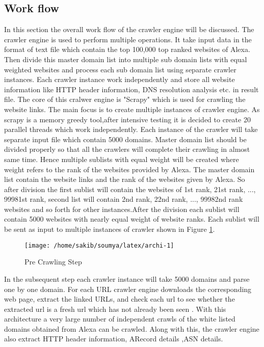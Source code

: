 \subsection{Work flow}
\noindent In this section the overall work flow of the crawler engine will be discussed. The crawler engine is used to perform multiple operations. It take input data in the format of text file which contain the top 100,000 top ranked websites of Alexa. Then divide this master domain list into multiple sub domain lists with equal weighted websites and process each sub domain list using separate crawler instances. Each crawler instance work independently and store all website information like HTTP header information, DNS resolution analysis etc. in result file. The core of this cralwer engine is "Scrapy" which is used for crawling the website links. The main focus is to create multiple instances of crawler engine. As scrapy is a memory greedy tool,after intensive testing it is decided to create 20 parallel threads which work independently. Each instance of the crawler will take separate input file which contain 5000 domains. Master domain list should be divided properly so that all the crawlers will complete their crawling in almost same time. Hence multiple sublists with equal weight will be created where weight refers to the rank of the websites provided by Alexa. The master domain list contain the website links and the rank of the websites given by Alexa. So after division the first sublist will contain the websites of 1st rank, 21st rank, ..., 99981st rank, second list will contain 2nd rank, 22nd rank, ..., 99982nd rank websites and so forth for other instances.After the division each sublist will contain 5000 websites with nearly equal weight of website ranks. Each sublist will be sent as input to multiple instances of crawler shown in Figure \ref{fig:crawl}. \\

\begin{figure}[htb]
  \centering
  \texttt{[image: /home/sakib/soumya/latex/archi-1]}\\
  \caption{Pre Crawling Step}
  \label{fig:crawl}
\end{figure}

\noindent In the subsequent step each crawler instance will take 5000 domains and parse one by one domain. For each URL crawler engine downloads the corresponding web page, extract the linked URLs, and check each url to see whether the extracted url is a fresh url which has not already been seen . With this architecture a very large number of independent crawls of the white listed domains obtained from Alexa can be crawled. Along with this, the crawler engine also extract HTTP header information, ARecord details ,ASN details.\\

